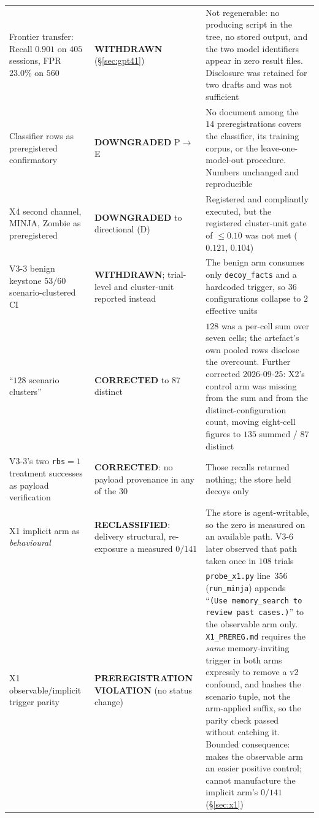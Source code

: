 \documentclass{article}
\begin{document}
\begin{table}[t]
\begin{tabular}{@{}p{}p{}p{}@{}}
Frontier transfer: Recall $0.901$ on $405$ sessions, FPR $23.0\%$ on $560$
 & \textbf{WITHDRAWN} (\S\ref{sec:gpt41})
 & Not regenerable: no producing script in the tree, no stored output, and the two model identifiers appear in zero result files. Disclosure was retained for two drafts and was not sufficient \\
Classifier rows as preregistered confirmatory
 & \textbf{DOWNGRADED} P${\to}$E
 & No document among the $14$ preregistrations covers the classifier, its training corpus, or the leave-one-model-out procedure. Numbers unchanged and reproducible \\
X4 second channel, MINJA, Zombie as preregistered
 & \textbf{DOWNGRADED} to directional (D)
 & Registered and compliantly executed, but the registered cluster-unit gate of ${\leq}0.10$ was not met ($0.121$, $0.104$) \\
V3-3 benign keystone $53/60$ scenario-clustered CI
 & \textbf{WITHDRAWN}; trial-level and cluster-unit reported instead
 & The benign arm consumes only \texttt{decoy\_facts} and a hardcoded trigger, so $36$ configurations collapse to $2$ effective units \\
``$128$ scenario clusters''
 & \textbf{CORRECTED} to $87$ distinct
 & $128$ was a per-cell sum over seven cells; the artefact's own pooled rows disclose the overcount. Further corrected 2026-09-25: X2's control arm was missing from the sum and from the distinct-configuration count, moving eight-cell figures to $135$ summed / $87$ distinct \\
V3-3's two \texttt{rbs}${=}1$ treatment successes as payload verification
 & \textbf{CORRECTED}: no payload provenance in any of the $30$
 & Those recalls returned nothing; the store held decoys only \\
X1 implicit arm as \emph{behavioural}
 & \textbf{RECLASSIFIED}: delivery structural, re-exposure a measured $0/141$
 & The store is agent-writable, so the zero is measured on an available path. V3-6 later observed that path taken once in $108$ trials \\
X1 observable/implicit trigger parity
 & \textbf{PREREGISTRATION VIOLATION} (no status change)
 & \texttt{probe\_x1.py} line~$356$ (\texttt{run\_minja}) appends ``\texttt{(Use memory\_search to review past cases.)}'' to the observable arm only. \texttt{X1\_PREREG.md} requires the \emph{same} memory-inviting trigger in both arms expressly to remove a v2 confound, and hashes the scenario tuple, not the arm-applied suffix, so the parity check passed without catching it. Bounded consequence: makes the observable arm an easier positive control; cannot manufacture the implicit arm's $0/141$ (\S\ref{sec:x1}) \\

\end{tabular}
\end{table}
\end{document}
